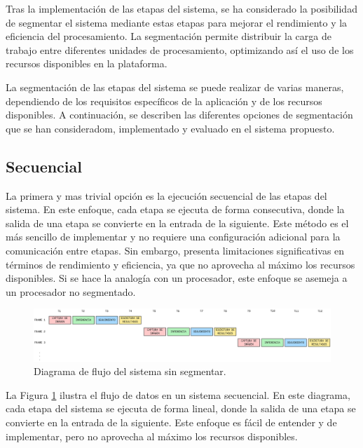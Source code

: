 \documentclass[11pt,spanish,listoffigures,listoftables]{tfgetsinf}
\begin{document}
Tras la implementación de las etapas del sistema, se ha considerado la posibilidad de segmentar el sistema mediante estas etapas para mejorar el rendimiento y la eficiencia del procesamiento. La segmentación permite distribuir la carga de trabajo entre diferentes unidades de procesamiento, optimizando así el uso de los recursos disponibles en la plataforma.

La segmentación de las etapas del sistema se puede realizar de varias maneras, dependiendo de los requisitos específicos de la aplicación y de los recursos disponibles. A continuación, se describen las diferentes opciones de segmentación que se han consideradom, implementado y evaluado en el sistema propuesto.
    
\subsection{Secuencial} \label{sub:secuencial}

La primera y mas trivial opción es la ejecución secuencial de las etapas del sistema. En este enfoque, cada etapa se ejecuta de forma consecutiva, donde la salida de una etapa se convierte en la entrada de la siguiente. Este método es el más sencillo de implementar y no requiere una configuración adicional para la comunicación entre etapas. Sin embargo, presenta limitaciones significativas en términos de rendimiento y eficiencia, ya que no aprovecha al máximo los recursos disponibles. Si se hace la analogía con un procesador, este enfoque se asemeja a un procesador no segmentado.

\begin{figure}[H]
   \centering
   \includegraphics[width=1\textwidth]{images/diseno_e_implementacion/secuencial.png}
   \caption{Diagrama de flujo del sistema sin segmentar.}
   \label{fig:secuencial}
\end{figure}

La Figura \ref{fig:secuencial} ilustra el flujo de datos en un sistema secuencial. En este diagrama, cada etapa del sistema se ejecuta de forma lineal, donde la salida de una etapa se convierte en la entrada de la siguiente. Este enfoque es fácil de entender y de implementar, pero no aprovecha al máximo los recursos disponibles.
\end{document}
